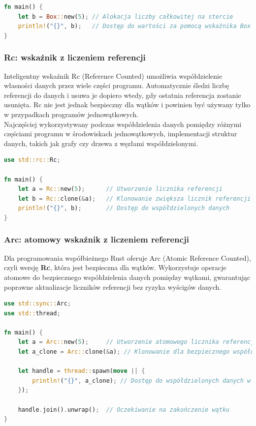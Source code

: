 \begin{lstlisting}[language=Rust, caption=Inteligentny wskaźnik Box, label=box_smart_pointer]
fn main() {
    let b = Box::new(5); // Alokacja liczby całkowitej na stercie
    println!("{}", b);   // Dostęp do wartości za pomocą wskaźnika Box
}
\end{lstlisting}

\subsubsection{Rc: wskaźnik z liczeniem referencji}
\label{RC}
Inteligentny wskaźnik Rc (Reference Counted) umożliwia współdzielenie własności danych przez wiele części programu. Automatycznie śledzi liczbę referencji do danych i usuwa je dopiero wtedy, gdy ostatnia referencja zostanie usunięta. Rc nie jest jednak bezpieczny dla wątków i powinien być używany tylko w przypadkach programów jednowątkowych.\\
Najczęściej wykorzystywany podczas współdzielenia danych pomiędzy różnymi częściami programu w środowiskach jednowątkowych, implementacji struktur danych, takich jak grafy czy drzewa z węzłami współdzielonymi.

\begin{lstlisting}[language=Rust, caption=Inteligentny wskaźnik RC, label=rc_smart_pointer]
use std::rc::Rc;

fn main() {
    let a = Rc::new(5);      // Utworzenie licznika referencji
    let b = Rc::clone(&a);   // Klonowanie zwiększa licznik referencji
    println!("{}", b);       // Dostęp do współdzielonych danych
}
\end{lstlisting}

\subsubsection{Arc: atomowy wskaźnik z liczeniem referencji}
\label{ARC}
Dla programowania współbieżnego Rust oferuje Arc (Atomic Reference Counted), czyli wersję \textbf{Rc}, która jest bezpieczna dla wątków. Wykorzystuje operacje atomowe do bezpiecznego współdzielenia danych pomiędzy wątkami, gwarantując poprawne aktualizacje liczników referencji bez ryzyka wyścigów danych.

\begin{lstlisting}[language=Rust, caption=Inteligentny wskaźnik Arc, label=arc_smart_pointer]
use std::sync::Arc;
use std::thread;

fn main() {
    let a = Arc::new(5);     // Utworzenie atomowego licznika referencji
    let a_clone = Arc::clone(&a); // Klonowanie dla bezpiecznego współdzielenia

    let handle = thread::spawn(move || {
        println!("{}", a_clone); // Dostęp do współdzielonych danych w nowym wątku
    });

    handle.join().unwrap();  // Oczekiwanie na zakończenie wątku
}
\end{lstlisting}
